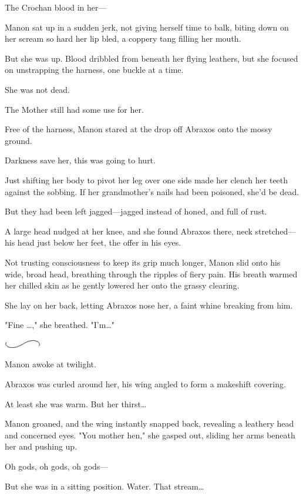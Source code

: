 The Crochan blood in her---

Manon sat up in a sudden jerk, not giving herself time to balk, biting down on her scream so hard her lip bled, a coppery tang filling her mouth.

But she was up. Blood dribbled from beneath her flying leathers, but she focused on unstrapping the harness, one buckle at a time.

She was not dead.

The Mother still had some use for her.

Free of the harness, Manon stared at the drop off Abraxos onto the mossy ground.

Darkness save her, this was going to hurt.

Just shifting her body to pivot her leg over one side made her clench her teeth against the sobbing. If her grandmother's nails had been poisoned, she'd be dead.

But they had been left jagged---jagged instead of honed, and full of rust.

A large head nudged at her knee, and she found Abraxos there, neck stretched---his head just below her feet, the offer in his eyes.

Not trusting consciousness to keep its grip much longer, Manon slid onto his wide, broad head, breathing through the ripples of fiery pain. His breath warmed her chilled skin as he gently lowered her onto the grassy clearing.

She lay on her back, letting Abraxos nose her, a faint whine breaking from him.

"Fine \ldots," she breathed. "I'm\ldots"

\includegraphics[width=0.65in,height=0.13in]{images/seperator}

Manon awoke at twilight.

Abraxos was curled around her, his wing angled to form a makeshift covering.

At least she was warm. But her thirst\ldots{}

Manon groaned, and the wing instantly snapped back, revealing a leathery head and concerned eyes. "You  mother hen," she gasped out, sliding her arms beneath her and pushing up.

Oh gods, oh gods, oh gods---

But she was in a sitting position. Water. That stream\ldots{}

